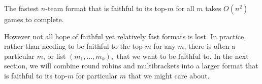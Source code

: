 {    \begin{conj}{}{}
        The fastest $n$-team format that is faithful to its top-$m$ for all $m$ takes $O(n^2)$ games to complete.
    \end{conj}

    However not all hope of faithful yet relatively fast formats is lost. In practice, rather than needing to be faithful to the top-$m$ for any $m$, there is often a particular $m$, or list $(m_1, ..., m_k),$ that we want to be faithful to. In the next section, we will combine round robins and multibrackets into a larger format that is faithful to its top-$m$ for particular $m$ that we might care about.
}